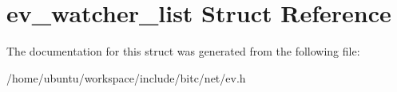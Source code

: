 \hypertarget{structev__watcher__list}{\section{ev\-\_\-watcher\-\_\-list Struct Reference}
\label{structev__watcher__list}
}


The documentation for this struct was generated from the following file\-:\begin{DoxyCompactItemize}
\item 
/home/ubuntu/workspace/include/bitc/net/ev.\-h\end{DoxyCompactItemize}
